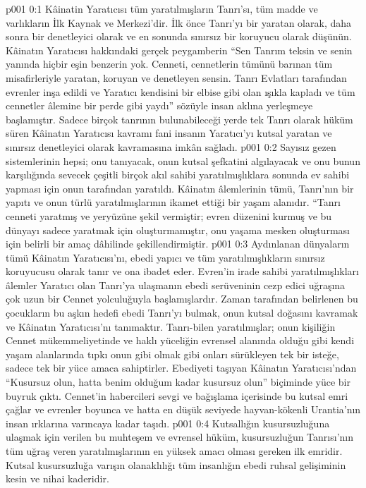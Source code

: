 \vs p001 0:1 Kâinatin Yaratıcısı tüm yaratılmışların Tanrı’sı, tüm madde ve varlıkların İlk Kaynak ve Merkezi’dir. İlk önce Tanrı’yı bir yaratan olarak, daha sonra bir denetleyici olarak ve en sonunda sınırsız bir koruyucu olarak düşünün. Kâinatın Yaratıcısı hakkındaki gerçek peygamberin “Sen Tanrım teksin ve senin yanında hiçbir eşin benzerin yok. Cenneti, cennetlerin tümünü barınan tüm misafirleriyle yaratan, koruyan ve denetleyen sensin. Tanrı Evlatları tarafından evrenler inşa edildi ve Yaratıcı kendisini bir elbise gibi olan ışıkla kapladı ve tüm cennetler âlemine bir perde gibi yaydı” sözüyle insan aklına yerleşmeye başlamıştır. Sadece birçok tanrının bulunabileceği yerde tek Tanrı olarak hüküm süren Kâinatın Yaratıcısı kavramı fani insanın Yaratıcı’yı kutsal yaratan ve sınırsız denetleyici olarak kavramasına imkân sağladı.
\vs p001 0:2 Sayısız gezen sistemlerinin hepsi; onu tanıyacak, onun kutsal şefkatini algılayacak ve onu bunun karşılığında sevecek çeşitli birçok akıl sahibi yaratılmışlıklara sonunda ev sahibi yapması için onun tarafından yaratıldı. Kâinatın âlemlerinin tümü, Tanrı’nın bir yapıtı ve onun türlü yaratılmışlarının ikamet ettiği bir yaşam alanıdır. “Tanrı cenneti yaratmış ve yeryüzüne şekil vermiştir; evren düzenini kurmuş ve bu dünyayı sadece yaratmak için oluşturmamıştır, onu yaşama mesken oluşturması için belirli bir amaç dâhilinde şekillendirmiştir.
\vs p001 0:3 Aydınlanan dünyaların tümü Kâinatın Yaratıcısı’nı, ebedi yapıcı ve tüm yaratılmışlıkların sınırsız koruyucusu olarak tanır ve ona ibadet eder. Evren’in irade sahibi yaratılmışlıkları âlemler Yaratıcı olan Tanrı’ya ulaşmanın ebedi serüveninin cezp edici uğraşına çok uzun bir Cennet yolculuğuyla başlamışlardır. Zaman tarafından belirlenen bu çocukların bu aşkın hedefi ebedi Tanrı’yı bulmak, onun kutsal doğasını kavramak ve Kâinatın Yaratıcısı’nı tanımaktır. Tanrı\hyp{}bilen yaratılmışlar; onun kişiliğin Cennet mükemmeliyetinde ve haklı yüceliğin evrensel alanında olduğu gibi kendi yaşam alanlarında tıpkı onun gibi olmak gibi onları sürükleyen tek bir isteğe, sadece tek bir yüce amaca sahiptirler. Ebediyeti taşıyan Kâinatın Yaratıcısı’ndan “Kusursuz olun, hatta benim olduğum kadar kusursuz olun” biçiminde yüce bir buyruk çıktı. Cennet’in habercileri sevgi ve bağışlama içerisinde bu kutsal emri çağlar ve evrenler boyunca ve hatta en düşük seviyede hayvan\hyp{}kökenli Urantia’nın insan ırklarına varıncaya kadar taşıdı.
\vs p001 0:4 Kutsallığın kusursuzluğuna ulaşmak için verilen bu muhteşem ve evrensel hüküm, kusursuzluğun Tanrısı’nın tüm uğraş veren yaratılmışlarının en yüksek amacı olması gereken ilk emridir. Kutsal kusursuzluğa varışın olanaklılığı tüm insanlığın ebedi ruhsal gelişiminin kesin ve nihai kaderidir.
